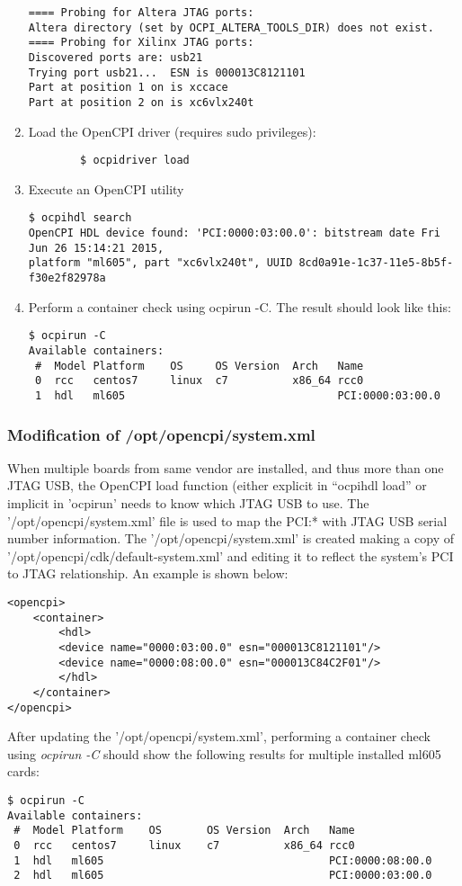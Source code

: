 \begin{enumerate}
\begin{verbatim}
==== Probing for Altera JTAG ports:
Altera directory (set by OCPI_ALTERA_TOOLS_DIR) does not exist.
==== Probing for Xilinx JTAG ports:
Discovered ports are: usb21
Trying port usb21...  ESN is 000013C8121101
Part at position 1 on is xccace
Part at position 2 on is xc6vlx240t
	\end{verbatim}\par\smallskip
	\item Load the OpenCPI driver (requires sudo privileges):\smallskip
	\begin{verbatim}
		$ ocpidriver load
	\end{verbatim}
	\item Execute an OpenCPI utility\smallskip
	\begin{verbatim}
$ ocpihdl search
OpenCPI HDL device found: 'PCI:0000:03:00.0': bitstream date Fri Jun 26 15:14:21 2015,
platform "ml605", part "xc6vlx240t", UUID 8cd0a91e-1c37-11e5-8b5f-f30e2f82978a
	\end{verbatim}
	\item Perform a container check using ocpirun -C. The result
	should look like this:\smallskip
	\begin{verbatim}
$ ocpirun -C
Available containers:
 #  Model Platform    OS     OS Version  Arch   Name
 0  rcc   centos7     linux  c7          x86_64 rcc0
 1  hdl   ml605                                 PCI:0000:03:00.0
  	\end{verbatim}
\end{enumerate}

\subsubsection{Modification of /opt/opencpi/system.xml}
When multiple boards from same vendor are installed, and thus more than one JTAG USB, the OpenCPI load function (either explicit in ``ocpihdl load'' or implicit in 'ocpirun' needs to know which JTAG USB to use. The '/opt/opencpi/system.xml' file is used to map the PCI:* with JTAG USB serial number information. The '/opt/opencpi/system.xml' is created making a copy of '/opt/opencpi/cdk/default-system.xml' and editing it to reflect the system's PCI to JTAG relationship.
An example is shown below:
	\begin{verbatim}
<opencpi>
    <container>
        <hdl>
        <device name="0000:03:00.0" esn="000013C8121101"/>
        <device name="0000:08:00.0" esn="000013C84C2F01"/>
        </hdl>
    </container>
</opencpi>
	\end{verbatim}
After updating the '/opt/opencpi/system.xml', performing a container check using \textit{ocpirun -C} should show the following results for multiple installed ml605 cards:
	\begin{verbatim}
$ ocpirun -C
Available containers:
 #  Model Platform    OS       OS Version  Arch   Name
 0  rcc   centos7     linux    c7          x86_64 rcc0
 1  hdl   ml605                                   PCI:0000:08:00.0
 2  hdl   ml605                                   PCI:0000:03:00.0
	\end{verbatim}


